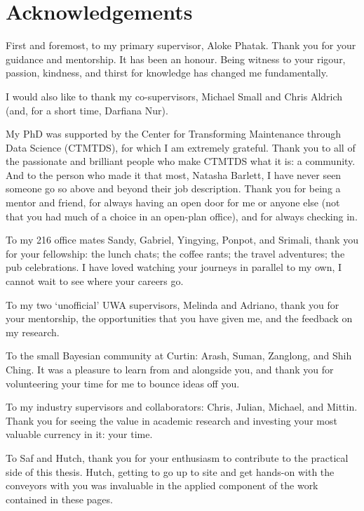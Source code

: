 
\chapter*{Acknowledgements} 

First and foremost, to my primary supervisor, Aloke Phatak. Thank you for your guidance and mentorship. It has been an honour. Being witness to your rigour, passion, kindness, and thirst for knowledge has changed me fundamentally.

I would also like to thank my co-supervisors, Michael Small and Chris Aldrich (and, for a short time, Darfiana Nur).

My PhD was supported by the Center for Transforming Maintenance through Data Science (CTMTDS), for which I am extremely grateful. Thank you to all of the passionate and brilliant people who make CTMTDS what it is: a community. And to the person who made it that most, Natasha Barlett, I have never seen someone go so above and beyond their job description. Thank you for being a mentor and friend, for always having an open door for me or anyone else (not that you had much of a choice in an open-plan office), and for always checking in.

To my 216 office mates Sandy, Gabriel, Yingying, Ponpot, and Srimali, thank you for your fellowship: the lunch chats; the coffee rants; the travel adventures; the pub celebrations. I have loved watching your journeys in parallel to my own, I cannot wait to see where your careers go.

To my two `unofficial' UWA supervisors, Melinda and Adriano, thank you for your mentorship, the opportunities that you have given me, and the feedback on my research.

To the small Bayesian community at Curtin: Arash, Suman, Zanglong, and Shih Ching. It was a pleasure to learn from and alongside you, and thank you for volunteering your time for me to bounce ideas off you. 

To my industry supervisors and collaborators: Chris, Julian, Michael, and Mittin. Thank you for seeing the value in academic research and investing your most valuable currency in it: your time.

To Saf and Hutch, thank you for your enthusiasm to contribute to the practical side of this thesis. Hutch, getting to go up to site and get hands-on with the conveyors with you was invaluable in the applied component of the work contained in these pages.

